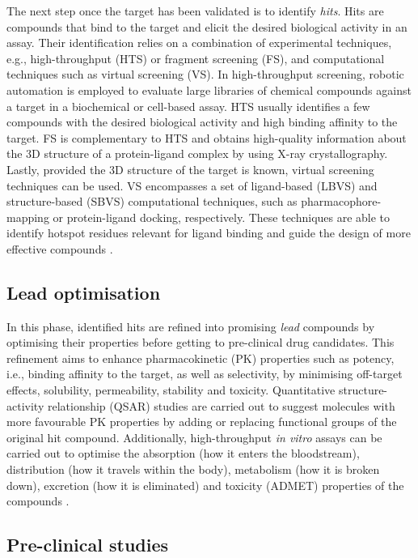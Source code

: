 The next step once the target has been validated is to identify \textit{hits}. Hits are compounds that bind to the target and elicit the desired biological activity in an assay. Their identification relies on a combination of experimental techniques, e.g., high-throughput (HTS) or fragment screening (FS), and computational techniques such as virtual screening (VS). In high-throughput screening, robotic automation is employed to evaluate large libraries of chemical compounds against a target in a biochemical or cell-based assay. HTS usually identifies a few compounds with the desired biological activity and high binding affinity to the target. FS is complementary to HTS and obtains high-quality information about the 3D structure of a protein-ligand complex by using X-ray crystallography. Lastly, provided the 3D structure of the target is known, virtual screening techniques can be used. VS encompasses a set of ligand-based (LBVS) and structure-based (SBVS) computational techniques, such as pharmacophore-mapping or protein-ligand docking, respectively. These techniques are able to identify hotspot residues relevant for ligand binding and guide the design of more effective compounds \cite{SINHA_2018_DD}.

\subsection{Lead optimisation}

In this phase, identified hits are refined into promising \textit{lead} compounds by optimising their properties before getting to pre-clinical drug candidates. This refinement aims to enhance pharmacokinetic (PK) properties such as potency, i.e., binding affinity to the target, as well as selectivity, by minimising off-target effects, solubility, permeability, stability and toxicity. Quantitative structure-activity relationship (QSAR) studies are carried out to suggest molecules with more favourable PK properties by adding or replacing functional groups of the original hit compound. Additionally, high-throughput \textit{in vitro} assays can be carried out to optimise the absorption (how it enters the bloodstream), distribution (how it travels within the body), metabolism (how it is broken down), excretion (how it is eliminated) and toxicity (ADMET) properties of the compounds \cite{SHOU_2020_ADME}.

\subsection{Pre-clinical studies}

